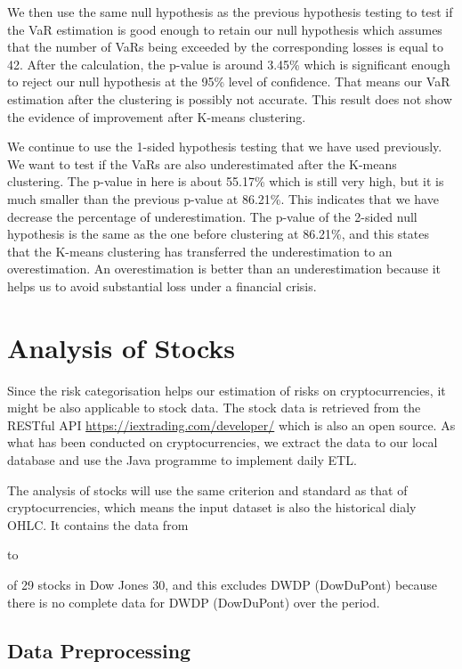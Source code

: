 \documentclass[11pt]{article} %
\theoremstyle{plain}
\theoremstyle{definition}
\begin{document}
We then use the same null hypothesis as the previous hypothesis testing to test if the VaR estimation is good enough to retain our null hypothesis which assumes that the number of VaRs being exceeded by the corresponding losses is equal to 42. After the calculation, the p-value is around 3.45\% which is significant enough to reject our null hypothesis at the 95\% level of confidence. That means our VaR estimation after the clustering is possibly not accurate. This result does not show the evidence of improvement after K-means clustering.

We continue to use the 1-sided hypothesis testing that we have used previously. We want to test if the VaRs are also underestimated after the K-means clustering. The p-value in here is about 55.17\% which is still very high, but it is much smaller than the previous p-value at 86.21\%. This indicates that we have decrease the percentage of underestimation. The p-value of the 2-sided null hypothesis is the same as the one before clustering at 86.21\%, and this states that the K-means clustering has transferred the underestimation to an overestimation. An overestimation is better than an underestimation because it helps us to avoid substantial loss under a financial crisis.

\section{Analysis of Stocks}

Since the risk categorisation helps our estimation of risks on cryptocurrencies, it might be also applicable to stock data. The stock data is retrieved from the RESTful API \url{https://iextrading.com/developer/}\cite{iextrading} which is also an open source. As what has been conducted on cryptocurrencies, we extract the data to our local database and use the Java programme to implement daily ETL.

The analysis of stocks will use the same criterion and standard as that of cryptocurrencies, which means the input dataset is also the historical dialy OHLC. It contains the data from \date{1st January 2016} to \date{31st July 2018} of 29 stocks in Dow Jones 30, and this excludes DWDP (DowDuPont) because there is no complete data for DWDP (DowDuPont) over the period.

\subsection{Data Preprocessing}
\end{document}
